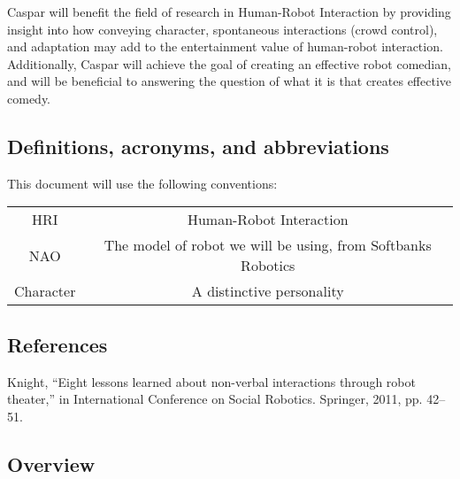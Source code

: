 \documentclass[onecolumn, draftclsnofoot,10pt, compsoc]{IEEEtran}
\begin{document}
Caspar will benefit the field of research in Human-Robot Interaction by  providing insight into how conveying character, spontaneous interactions (crowd control), and adaptation may add to the entertainment value of human-robot interaction. Additionally, Caspar will achieve the goal of creating an effective robot comedian, and will be beneficial to answering the question of what it is that creates effective comedy.


\subsection{Definitions, acronyms, and abbreviations}
This document will use the following conventions:
\begin{center}
\begin{tabular}{ |c|c| }
 \hline
 HRI & Human-Robot Interaction \\
 NAO & The model of robot we will be using, from Softbanks Robotics \\
 Character & A distinctive personality \\
 \hline
\end{tabular}
\end{center}

\subsection{References}


Knight, “Eight lessons learned about non-verbal interactions through robot theater,” in International Conference on Social Robotics. Springer,
2011, pp. 42–51.

\subsection{Overview}
\end{document}
